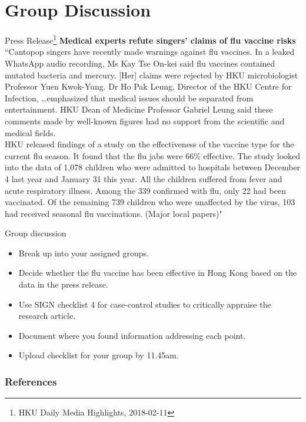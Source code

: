 \documentclass{beamer}
\begin{document}
\section{Group Discussion}

\begin{frame}{Press Release\footnote{\tiny{HKU Daily Media Highlights, 2018-02-11}}}
\textbf{Medical experts refute singers' claims of flu vaccine risks}
\\
\vspace{3mm}
\footnotesize{``Cantopop singers have recently made warnings against flu vaccines. In a leaked WhatsApp audio recording, Ms Kay Tse On-kei said flu vaccines contained mutated bacteria and mercury. [Her] claims were rejected by HKU microbiologist Professor Yuen Kwok-Yung. Dr Ho Pak Leung, Director of the HKU Centre for Infection, \dots emphasized that medical issues should be separated from entertainment. HKU Dean of Medicine Professor Gabriel Leung said these comments made by well-known figures had no support from the scientific and medical fields. \\
\vspace{3mm}
HKU released findings of a study on the effectiveness of the vaccine type for the current flu season. It found that the flu jabs were 66\% effective. The study looked into the data of 1,078 children who were admitted to hospitals between December 4 last year and January 31 this year. All the children suffered from fever and acute respiratory illness. Among the 339 confirmed with flu, only 22 had been vaccinated. Of the remaining 739 children who were unaffected by the virus, 103 had received seasonal flu vaccinations. (Major local papers)"}
\end{frame}

\begin{frame}{Group discussion}
	\begin{itemize}
	\item Break up into your assigned groups.
	\item Decide whether the flu vaccine has been effective in Hong Kong based on the data in the press release.  
	\item Use SIGN checklist 4 for case-control studies to critically appraise the research article.
	\item Document \alert{where} you found information addressing each point.
	\item Upload checklist for your group by 11.45am.
	\end{itemize}
\end{frame}

\begin{frame} [shrink=15] %
	\frametitle{References}
	
	\small
\end{frame}
\end{document}
